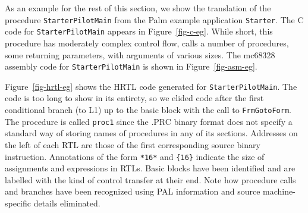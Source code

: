 As an example for the rest of this section,
we show the translation of the procedure \texttt{StarterPilotMain}
from the Palm example application \texttt{Starter}.
The C code for \texttt{StarterPilotMain} appears in Figure~\ref{fig-c-eg}. 
While short, this procedure has moderately complex control flow,
calls a number of procedures, some returning parameters,
with arguments of various sizes.
The mc68328 assembly code for \texttt{StarterPilotMain}
is shown in Figure~\ref{fig-asm-eg}.

	Figure~\ref{fig-hrtl-eg} shows the HRTL code generated for
	\texttt{StarterPilotMain}.
	The code is too long to show in its entirety,
	so we elided code after the first conditional branch (to L1)
	up to the basic block with the call to \texttt{FrmGotoForm}.
        The procedure is called \texttt{proc1} since the .PRC binary format 
        does not specify a standard way of storing names of procedures in 
        any of its sections.
        Addresses on the left of each RTL are those of the first corresponding
        source binary instruction.
        Annotations of the form \texttt{*16*} and \texttt{\{16\}}
        indicate the size of assignments and expressions in RTLs.
        Basic blocks have been identified and are labelled with the kind
        of control transfer at their end.
        Note how procedure calls and branches have been recognized 
        using PAL information and source machine-specific details
        eliminated.

\centerfigbegin
{}


